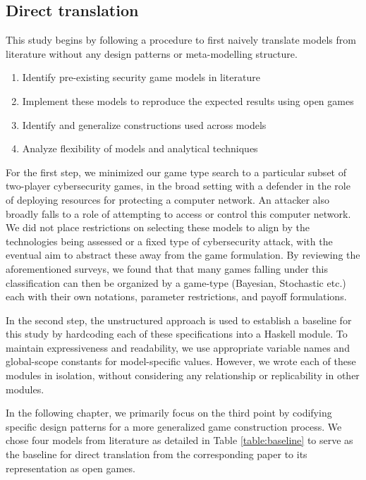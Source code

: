 \documentclass[11pt,titlepage,dvipsnames,table,xcdraw,english]{article}
\begin{document}
\subsection{Direct translation}
\label{designPatterns:directTranslation}
This study begins by following a procedure to first naively translate models from literature without any design patterns or meta-modelling structure. 

\begin{enumerate}
	\item Identify pre-existing security game models in literature 
	\item Implement these models to reproduce the expected results using open games
	\item Identify and generalize constructions used across models
	\item Analyze flexibility of models and analytical techniques 
\end{enumerate}

For the first step, we minimized our game type search to a particular subset of two-player cybersecurity games, in the broad setting with a defender in the role of deploying resources for protecting a computer network. An attacker also broadly falls to a role of attempting to access or control this computer network. We did not place restrictions on selecting these models to align by the technologies being assessed or a fixed type of cybersecurity attack, with the eventual aim to abstract these away from the game formulation. By reviewing the aforementioned surveys, we found that that many games falling under this classification can then be organized by a game-type (Bayesian, Stochastic etc.) each with their own notations, parameter restrictions, and payoff formulations. 

In the second step, the unstructured approach is used to establish a baseline for this study by hardcoding each of these specifications into a Haskell module. To maintain expressiveness and readability, we use appropriate variable names and global-scope constants for model-specific values. However, we wrote each of these modules in isolation, without considering any relationship or replicability in other modules. 

In the following chapter, we primarily focus on the third point by codifying specific design patterns for a more generalized game construction process. We chose four models from literature as detailed in Table \ref{table:baseline} to serve as the baseline for direct translation from the corresponding paper to its representation as open games. 
\end{document}
